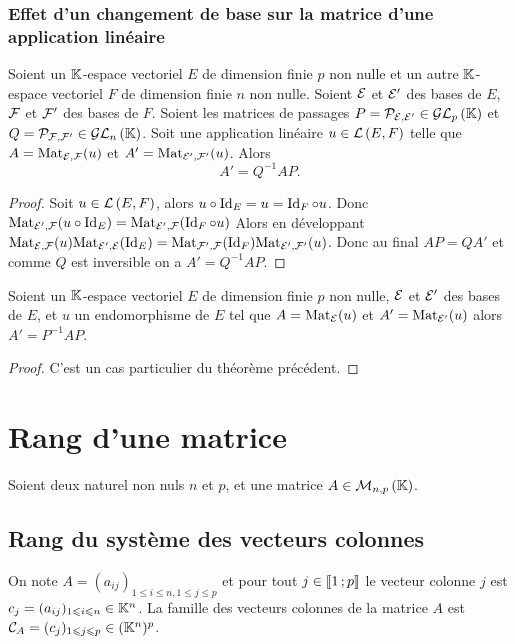 \subsubsection{Effet d'un changement de base sur la matrice d'une application linéaire}

\begin{theo}
  Soient un $\mathbb{K}$-espace vectoriel $E$ de dimension finie $p$ non nulle et un autre $\mathbb{K}$-espace vectoriel $F$ de dimension finie $n$ non nulle. Soient $\mathcal{E}$ et $\mathcal{E}'$ des bases de $E$, $\mathcal{F}$ et $\mathcal{F}'$ des bases de $F$. Soient les matrices de passages $P=\mathcal{P}_{\mathcal{E},\mathcal{E}'} \in \mathcal{GL}_{p}\left(\mathbb{K}\right)$ et $Q=\mathcal{P}_{\mathcal{F},\mathcal{F}'} \in \mathcal{GL}_{n}\left(\mathbb{K}\right)$. Soit une application linéaire $u \in \mathcal{L}\left(E,F\right)$ telle que $A=\mathrm{Mat}_{\mathcal{E},\mathcal{F}}(u)$ et $A'=\mathrm{Mat}_{\mathcal{E}',\mathcal{F}'}(u)$. Alors
  \begin{equation}
    A'=Q^{-1}AP.
  \end{equation}
\end{theo}
\begin{proof}
  Soit  $u \in \mathcal{L}\left(E,F\right)$, alors $u \circ \operatorname{Id}_E = u = \operatorname{Id}_F \circ u$. Donc $\mathrm{Mat}_{\mathcal{E}',\mathcal{F}}(u \circ \operatorname{Id}_E) = \mathrm{Mat}_{\mathcal{E}',\mathcal{F}}(\operatorname{Id}_F \circ u)$ Alors en développant $\mathrm{Mat}_{\mathcal{E},\mathcal{F}}(u) \mathrm{Mat}_{\mathcal{E}',\mathcal{E}}(\operatorname{Id}_E) =\mathrm{Mat}_{\mathcal{F}',\mathcal{F}}(\operatorname{Id}_F) \mathrm{Mat}_{\mathcal{E}',\mathcal{F}'}(u) $. Donc au final $AP=QA'$ et comme $Q$ est inversible on a $A'=Q^{-1}AP$.
\end{proof}

\begin{theo}
   Soient un $\mathbb{K}$-espace vectoriel $E$ de dimension finie $p$ non nulle, $\mathcal{E}$ et $\mathcal{E}'$ des bases de $E$, et $u$ un endomorphisme de $E$ tel que $A=\mathrm{Mat}_{\mathcal{E}}(u)$ et $A'=\mathrm{Mat}_{\mathcal{E}'}(u)$ alors $A'=P^{-1}AP$.
\end{theo}
\begin{proof}
  C'est un cas particulier du théorème précédent.
\end{proof}

\section{Rang d'une matrice}

Soient deux naturel non nuls $n$ et $p$, et une matrice $A \in \mathcal{M}_{n,p}\left(\mathbb{K}\right)$.

\subsection{Rang du système des vecteurs colonnes}

On note $A=(a_{ij})_{1\leqslant i\leqslant n, 1\leqslant j\leqslant p}$ et pour tout $j \in \mathopen{\llbracket}1\mathclose{}\mathpunct{};p\mathclose{\rrbracket}$ le vecteur colonne $j$ est $c_j=(a_{ij})_{1 \leqslant i \leqslant n} \in \mathbb{K}^n$. La famille des vecteurs colonnes de la matrice $A$ est $\mathcal{C}_A=(c_j)_{1 \leqslant j \leqslant p} \in (\mathbb{K}^n)^p$.

